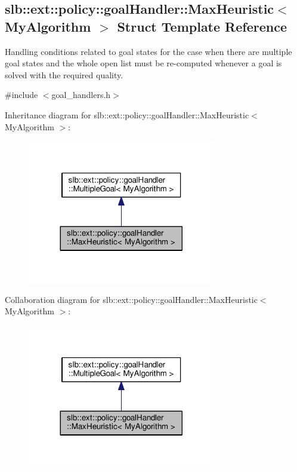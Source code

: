\hypertarget{structslb_1_1ext_1_1policy_1_1goalHandler_1_1MaxHeuristic}{}\subsection{slb\+:\+:ext\+:\+:policy\+:\+:goal\+Handler\+:\+:Max\+Heuristic$<$ My\+Algorithm $>$ Struct Template Reference}
\label{structslb_1_1ext_1_1policy_1_1goalHandler_1_1MaxHeuristic}


Handling conditions related to goal states for the case when there are multiple goal states and the whole open list must be re-\/computed whenever a goal is solved with the required quality.  




{\ttfamily \#include $<$goal\+\_\+handlers.\+h$>$}



Inheritance diagram for slb\+:\+:ext\+:\+:policy\+:\+:goal\+Handler\+:\+:Max\+Heuristic$<$ My\+Algorithm $>$\+:\nopagebreak
\begin{figure}[H]
\begin{center}
\leavevmode
\includegraphics[width=233pt]{structslb_1_1ext_1_1policy_1_1goalHandler_1_1MaxHeuristic__inherit__graph}
\end{center}
\end{figure}


Collaboration diagram for slb\+:\+:ext\+:\+:policy\+:\+:goal\+Handler\+:\+:Max\+Heuristic$<$ My\+Algorithm $>$\+:\nopagebreak
\begin{figure}[H]
\begin{center}
\leavevmode
\includegraphics[width=233pt]{structslb_1_1ext_1_1policy_1_1goalHandler_1_1MaxHeuristic__coll__graph}
\end{center}
\end{figure}
